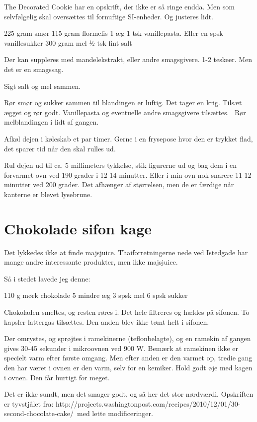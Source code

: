 \documentclass[
  letterpaper,
  DIV=11,
  numbers=noendperiod]{scrreprt}
\begin{document}
The Decorated Cookie har en opskrift, der ikke er så ringe endda. Men
som selvfølgelig skal oversættes til fornuftige SI-enheder. Og justeres
lidt.

225 gram smør 115 gram flormelis 1 æg 1 tsk vanillepasta. Eller en spsk
vanillesukker 300 gram mel ½ tsk fint salt

Der kan suppleres med mandelekstrakt, eller andre smagsgivere. 1-2
teskeer. Men det er en smagssag.

Sigt salt og mel sammen.

Rør smør og sukker sammen til blandingen er luftig. Det tager en krig.
Tilsæt ægget og rør godt. Vanillepasta og eventuelle andre smagsgivere
tilsættes.~ Rør melblandingen i lidt af gangen.

Afkøl dejen i køleskab et par timer. Gerne i en frysepose hvor den er
trykket flad, det sparer tid når den skal rulles ud.

Rul dejen ud til ca. 5 millimeters tykkelse, stik figurerne ud og bag
dem i en forvarmet ovn ved 190 grader i 12-14 minutter. Eller i min ovn
nok snarere 11-12 minutter ved 200 grader. Det afhænger af størrelsen,
men de er færdige når kanterne er blevet lysebrune.

\hypertarget{chokolade-sifon-kage}{%
\section{Chokolade sifon kage}\label{chokolade-sifon-kage}}

Det lykkedes ikke at finde majsjuice. Thaiforretningerne nede ved
Istedgade har mange andre interessante produkter, men ikke majsjuice.

Så i stedet lavede jeg denne:

110 g mørk chokolade 5 mindre æg 3 spsk mel 6 spsk sukker

Chokoladen smeltes, og resten røres i. Det hele filtreres og hældes på
sifonen. To kapsler lattergas tilsættes. Den anden blev ikke tømt helt i
sifonen.

Der omrystes, og sprøjtes i ramekinerne (teflonbelagte), og en ramekin
af gangen gives 30-45 sekunder i mikroovnen ved 900 W. Bemærk at
ramekinen ikke er specielt varm efter første omgang. Men efter anden er
den varmet op, tredie gang den har været i ovnen er den varm, selv for
en kemiker. Hold godt øje med kagen i ovnen. Den får hurtigt for meget.

Det er ikke sundt, men det smager godt, og så her det stor nørdværdi.
Opskriften er tyvstjålet fra:
http://projects.washingtonpost.com/recipes/2010/12/01/30-second-chocolate-cake/~med
lette modificeringer.
\end{document}
